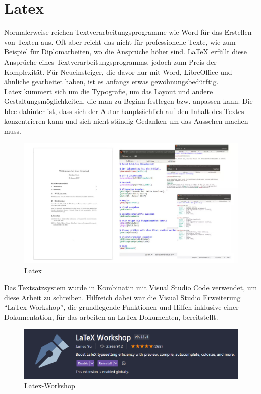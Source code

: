 \section{Latex}
Normalerweise reichen Textverarbeitungsprogramme wie Word für das Erstellen
von Texten aus. Oft aber reicht das nicht für professionelle Texte, wie zum Beispiel
für Diplomarbeiten, wo die Ansprüche höher sind. LaTeX erfüllt diese Ansprüche eines 
Textverarbeitungsprogramms, jedoch zum Preis der Komplexität. Für Neueinsteiger, die davor nur mit
Word, LibreOffice und ähnliche gearbeitet haben, ist es anfangs etwas gewöhnungsbedürftig.
\\
Latex kümmert sich um die Typografie, um das Layout und andere Gestaltungsmöglichkeiten,
die man zu Beginn festlegen bzw. anpassen kann. Die Idee dahinter ist, dass sich der Autor 
hauptsächlich auf den Inhalt des Textes konzentrieren kann und sich nicht ständig Gedanken um 
das Aussehen machen muss. \cite{APCW2008}


\begin{figure}[ht!]
  \centering
  \includegraphics[scale=.4]{pics/latex.jpg}
  \caption{\label{fig:The-caption}Latex \cite{APCW2008}}
  \label{fig:impl:use-case-diagramm}
\end{figure}

Das Textsatzsystem wurde in Kombinatin mit Visual Studio Code verwendet, um diese Arbeit zu schreiben.
Hilfreich dabei war die Visual Studio Erweiterung ``LaTex Workshop'', die grundlegende Funktionen und Hilfen inklusive einer 
Dokumentation, für das arbeiten an LaTex-Dokumenten, bereitstellt.

\begin{figure}[ht!]
  \centering
  \includegraphics[scale=.7]{pics/latex-workshop.PNG}
  \caption{\label{fig:The-caption}Latex-Workshop}
  \label{fig:impl:use-case-diagramm}
\end{figure}

